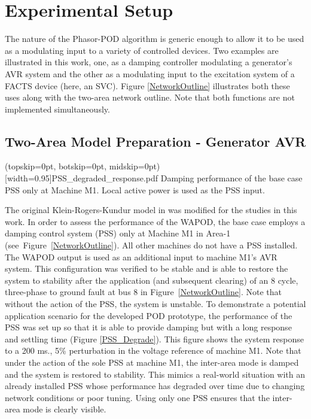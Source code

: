 \documentclass{ieeeaccess}
\begin{document}
\section{Experimental Setup}\label{SetupPreparation}

The nature of the Phasor-POD algorithm is generic enough to allow it to be used as a modulating input to a variety of controlled devices. Two examples are illustrated in this work, one, as a damping controller modulating a generator\rq{s} AVR system and the other as a modulating input to the excitation system of a FACTS device (here, an SVC). Figure \ref{NetworkOutline} illustrates both these uses along with the two-area network outline. Note that both functions are not implemented simultaneously.

\subsection{Two-Area Model Preparation - Generator AVR}

\Figure[tbp](topskip=0pt, botskip=0pt, midskip=0pt)[width=0.95\columnwidth]{PSS_degraded_response.pdf}
{Damping performance of the base case PSS only at Machine M1. Local active power is used as the PSS input.\label{PSS_Degrade}}

The original Klein-Rogers-Kundur model in \cite{KundurTwoArea} was modified for the studies in this work. In order to assess the performance of the WAPOD, the base case employs a damping control system (PSS) only at Machine M1 in Area-1 (see~Figure~\ref{NetworkOutline}). All other machines do not have a PSS installed. The WAPOD output is used as an additional input to machine M1\rq{s} AVR system. This configuration was  verified to be stable and is able to restore the system to stability after the application (and subsequent clearing) of an 8 cycle, three-phase to ground fault at bus 8 in Figure~\ref{NetworkOutline}. Note that without the action of the PSS, the system is unstable. To demonstrate a potential application scenario for the developed POD prototype, the performance of the PSS was set up so that it is able to provide damping but with a long response and settling time (Figure \ref{PSS_Degrade}). This figure shows the system response to a 200 ms., 5\% perturbation in the voltage reference of machine M1. Note that under the action of the sole PSS at machine M1, the inter-area mode is damped and the system is restored to stability. This mimics a real-world situation with an already installed PSS whose performance has degraded over time due to changing network conditions or poor tuning. Using only one PSS ensures that the inter-area mode is clearly visible. 
\end{document}
